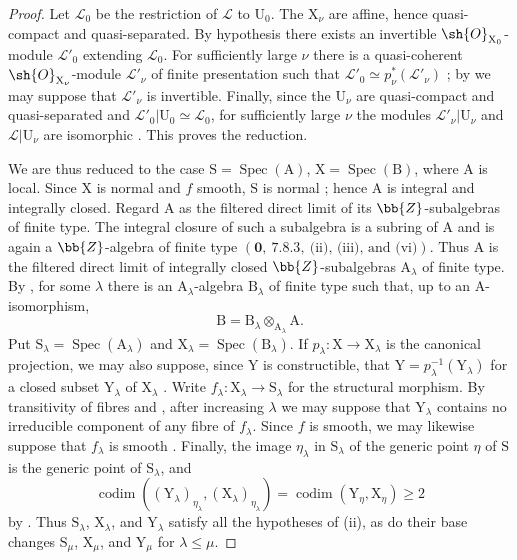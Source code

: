 \begin{proof}
Let $\mathscr{L}_0$ be the restriction of $\mathscr{L}$ to $\mathrm{U}_0$. The $\mathrm{X}_\nu$ are affine, hence quasi-compact and quasi-separated. By hypothesis there exists an invertible $\sh{O}_{\mathrm{X}_0}$-module $\mathscr{L}'_0$ extending $\mathscr{L}_0$. For sufficiently large $\nu$ there is a quasi-coherent $\sh{O}_{\mathrm{X}_\nu}$-module $\mathscr{L}'_\nu$ of finite presentation such that $\mathscr{L}'_0\simeq p_\nu^*(\mathscr{L}'_\nu)$ ; by  we may suppose that $\mathscr{L}'_\nu$ is invertible. Finally, since the $\mathrm{U}_\nu$ are quasi-compact and quasi-separated and $\mathscr{L}'_0|\mathrm{U}_0\simeq\mathscr{L}_0$, for sufficiently large $\nu$ the modules $\mathscr{L}'_\nu|\mathrm{U}_\nu$ and $\mathscr{L}|\mathrm{U}_\nu$ are isomorphic . This proves the reduction.

We are thus reduced to the case $\mathrm{S}=\operatorname{Spec}(\mathrm{A})$, $\mathrm{X}=\operatorname{Spec}(\mathrm{B})$, where $\mathrm{A}$ is local. Since $\mathrm{X}$ is normal and $f$ smooth, $\mathrm{S}$ is normal ; hence $\mathrm{A}$ is integral and integrally closed. Regard $\mathrm{A}$ as the filtered direct limit of its $\bb{Z}$-subalgebras of finite type. The integral closure of such a subalgebra is a subring of $\mathrm{A}$ and is again a $\bb{Z}$-algebra of finite type $(\mathbf{0},\ 7.8.3,\ \text{(ii), (iii), and (vi)})$. Thus $\mathrm{A}$ is the filtered direct limit of integrally closed $\bb{Z}$-subalgebras $\mathrm{A}_\lambda$ of finite type. By , for some $\lambda$ there is an $\mathrm{A}_\lambda$-algebra $\mathrm{B}_\lambda$ of finite type such that, up to an $\mathrm{A}$-isomorphism,
\[
  \mathrm{B}=\mathrm{B}_\lambda\otimes_{\mathrm{A}_\lambda}\mathrm{A}.
\]
Put $\mathrm{S}_\lambda=\operatorname{Spec}(\mathrm{A}_\lambda)$ and $\mathrm{X}_\lambda=\operatorname{Spec}(\mathrm{B}_\lambda)$. If $p_\lambda:\mathrm{X}\to\mathrm{X}_\lambda$ is the canonical projection, we may also suppose, since $\mathrm{Y}$ is constructible, that $\mathrm{Y}=p_\lambda^{-1}(\mathrm{Y}_\lambda)$ for a closed subset $\mathrm{Y}_\lambda$ of $\mathrm{X}_\lambda$ . Write $f_\lambda:\mathrm{X}_\lambda\to\mathrm{S}_\lambda$ for the structural morphism. By transitivity of fibres and , after increasing $\lambda$ we may suppose that $\mathrm{Y}_\lambda$ contains no irreducible component of any fibre of $f_\lambda$. Since $f$ is smooth, we may likewise suppose that $f_\lambda$ is smooth . Finally, the image $\eta_\lambda$ in $\mathrm{S}_\lambda$ of the generic point $\eta$ of $\mathrm{S}$ is the generic point of $\mathrm{S}_\lambda$, and
\[
  \operatorname{codim}((\mathrm{Y}_\lambda)_{\eta_\lambda},
  (\mathrm{X}_\lambda)_{\eta_\lambda})
  =\operatorname{codim}(\mathrm{Y}_\eta,\mathrm{X}_\eta)\geq2
\]
by . Thus $\mathrm{S}_\lambda$, $\mathrm{X}_\lambda$, and $\mathrm{Y}_\lambda$ satisfy all the hypotheses of (ii), as do their base changes $\mathrm{S}_\mu$, $\mathrm{X}_\mu$, and $\mathrm{Y}_\mu$ for $\lambda\leq\mu$.


\end{proof}
